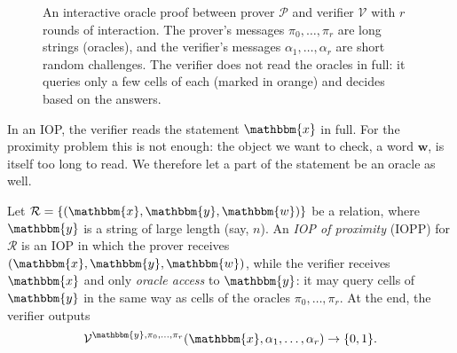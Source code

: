 \documentclass[../../book]{subfiles}
\begin{document}
\begin{figure}[h!]
    \caption{An interactive oracle proof between prover $\mathcal{P}$ and verifier $\mathcal{V}$ with $r$ rounds of interaction. The prover's messages $\pi_0, \dots, \pi_r$ are long strings (oracles), and the verifier's messages $\alpha_1, \dots, \alpha_r$ are short random challenges. The verifier does not read the oracles in full: it queries only a few cells of each (marked in orange) and decides based on the answers.}
    \label{fig:iop-definition}
\end{figure}

In an IOP, the verifier reads the statement $\mathbbm{x}$ in full.
For the proximity problem this is not enough: the object we want to check, a word $\mathbf{w}$, is itself too long to read.
We therefore let a part of the statement be an oracle as well.

\begin{definition}\label{def:iopp}
    Let $\mathcal{R} = \{(\mathbbm{x}, \mathbbm{y}, \mathbbm{w})\}$ be a relation, where $\mathbbm{y}$ is a string of large length (say, $n$).
    An \emph{IOP of proximity} (IOPP) for $\mathcal{R}$ is an IOP in which the prover receives $(\mathbbm{x}, \mathbbm{y}, \mathbbm{w})$, while the verifier receives $\mathbbm{x}$ and only \emph{oracle access} to $\mathbbm{y}$: it may query cells of $\mathbbm{y}$ in the same way as cells of the oracles $\pi_0, \dots, \pi_r$.
    At the end, the verifier outputs
    \begin{equation*}
        \mathcal{V}^{\mathbbm{y}, \pi_0, \dots, \pi_r}(\mathbbm{x}, \alpha_1, \dots, \alpha_r) \to \{0,1\}.
    \end{equation*}
\end{definition}
\end{document}
